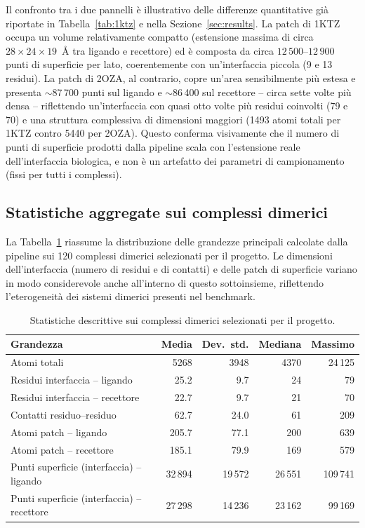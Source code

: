 \documentclass[11pt,a4paper]{article}
\begin{document}
Il confronto tra i due pannelli è illustrativo delle differenze quantitative già riportate in Tabella~\ref{tab:1ktz} e nella Sezione~\ref{sec:results}. La patch di 1KTZ occupa un volume relativamente compatto (estensione massima di circa $28\times24\times19$~\r{A} tra ligando e recettore) ed è composta da circa $12\,500$--$12\,900$ punti di superficie per lato, coerentemente con un'interfaccia piccola (9 e 13 residui). La patch di 2OZA, al contrario, copre un'area sensibilmente più estesa e presenta $\sim$87\,700 punti sul ligando e $\sim$86\,400 sul recettore -- circa sette volte più densa -- riflettendo un'interfaccia con quasi otto volte più residui coinvolti (79 e 70) e una struttura complessiva di dimensioni maggiori (1493 atomi totali per 1KTZ contro 5440 per 2OZA). Questo conferma visivamente che il numero di punti di superficie prodotti dalla pipeline scala con l'estensione reale dell'interfaccia biologica, e non è un artefatto dei parametri di campionamento (fissi per tutti i complessi).

\subsection{Statistiche aggregate sui complessi dimerici}
La Tabella~\ref{tab:stats} riassume la distribuzione delle grandezze principali calcolate dalla pipeline sui 120 complessi dimerici selezionati per il progetto. Le dimensioni dell'interfaccia (numero di residui e di contatti) e delle patch di superficie variano in modo considerevole anche all'interno di questo sottoinsieme, riflettendo l'eterogeneità dei sistemi dimerici presenti nel benchmark.

\begin{table}[h]
\centering
\caption{Statistiche descrittive sui complessi dimerici selezionati per il progetto.}
\label{tab:stats}
\begin{tabular}{lrrrr}
\toprule
Grandezza & Media & Dev.\ std. & Mediana & Massimo \\
\midrule
Atomi totali & 5268 & 3948 & 4370 & 24\,125 \\
Residui interfaccia -- ligando & 25.2 & 9.7 & 24 & 79 \\
Residui interfaccia -- recettore & 22.7 & 9.7 & 21 & 70 \\
Contatti residuo--residuo & 62.7 & 24.0 & 61 & 209 \\
Atomi patch -- ligando & 205.7 & 77.1 & 200 & 639 \\
Atomi patch -- recettore & 185.1 & 79.9 & 169 & 579 \\
Punti superficie (interfaccia) -- ligando & 32\,894 & 19\,572 & 26\,551 & 109\,741 \\
Punti superficie (interfaccia) -- recettore & 27\,298 & 14\,236 & 23\,162 & 99\,169 \\
\bottomrule
\end{tabular}
\end{table}
\end{document}
